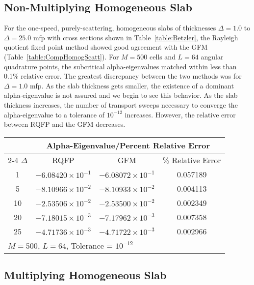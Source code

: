 \subsection{Non-Multiplying Homogeneous Slab}
For the one-speed, purely-scattering, homogeneous slabs of thicknesses $\Delta = 1.0$ to $\Delta = 25.0$ mfp with cross sections shown in Table~\ref{table:Betzler}, the Rayleigh quotient fixed point method showed good agreement with the GFM (Table~\ref{table:CompHomogScatt}). For $M = 500$ cells and $L = 64$ angular quadrature points, the subcritical alpha-eigenvalues matched within less than 0.1\% relative error. The greatest discrepancy between the two methods was for $\Delta = 1.0$ mfp. As the slab thickness gets smaller, the existence of a dominant alpha-eigenvalue is not assured and we begin to see this behavior. As the slab thickness increases, the number of transport sweeps necessary to converge the alpha-eigenvalue to a tolerance of $10^{-12}$ increases. However, the relative error between RQFP and the GFM decreases. 

\begin{table*}[t]
\centering{}
\caption{Comparison of RQFP- and GFM-calculated alpha-eigenvalues for a homogeneous scattering slab}
\label{table:CompHomogScatt}
\begin{tabular}{@{}cccc@{}}\toprule
& \multicolumn{3}{c}{Alpha-Eigenvalue/Percent Relative Error} \\
\cmidrule{2-4} $\Delta$ & RQFP & GFM & \% Relative Error \\
\midrule
1 & $-6.08420 \times 10^{-1}$ & $-6.08072 \times 10^{-1}$ & 0.057189 \\ 
5 & $-8.10966 \times 10^{-2}$ & $-8.10933 \times 10^{-2}$ & 0.004113 \\ 
10 & $-2.53506 \times 10^{-2}$ & $-2.53500 \times 10^{-2}$ & 0.002349 \\ 
20 & $-7.18015 \times 10^{-3}$ & $-7.17962 \times 10^{-3}$ & 0.007358 \\ 
25 & $-4.71736 \times 10^{-3}$ & $-4.71722 \times 10^{-3}$ & 0.002966 \\ 
\bottomrule
\multicolumn{4}{l}{$M = 500$, $L = 64$, Tolerance = $10^{-12}$} \\
\end{tabular}
\end{table*}

\subsection{Multiplying Homogeneous Slab}

